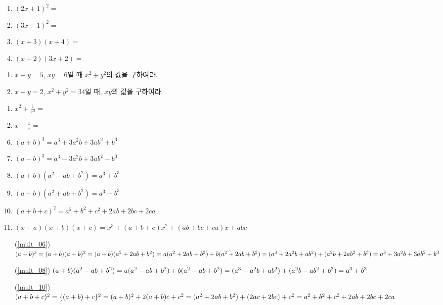 \documentclass{oblivoir}
\begin{document}
%
\begin{enumerate}\label{mult1}
\item
\((2x+1)^2=\)
\item
\((3x-1)^2=\)
\item
\((x+3)(x+4)=\)
\item
\((x+2)(3x+2)=\)
\end{enumerate}

%
\prob{}
\begin{enumerate}\label{mult2}
\item
\(x+y=5\), \(xy=6\)일 때 \(x^2+y^2\)의 값을 구하여라.
\item
\(x-y=2\), \(x^2+y^2=34\)일 때, \(xy\)의 값을 구하여라.
\end{enumerate}

%
\begin{enumerate}\label{mult3}
\item
\(x^2+\frac1{x^2}=\)
\item
\(x-\frac1x=\)
\end{enumerate}

\newpage
%
\begin{mdframed}
\begin{enumerate}
\setcounter{enumi}{5}
\item\label{mult_06}
\((a+b)^3=a^3+3a^2b+3ab^2+b^3\)
\item\label{mult_07}
\((a-b)^3=a^3-3a^2b+3ab^2-b^3\)
\item\label{mult_08}
\((a+b)(a^2-ab+b^2)=a^3+b^3\)
\item\label{mult_09}
\((a-b)(a^2+ab+b^2)=a^3-b^3\)
\item\label{mult_10}
\((a+b+c)^2=a^2+b^2+c^2+2ab+2bc+2ca\)
\item\label{mult_11}
\((x+a)(x+b)(x+c)=x^3+(a+b+c)x^2+(ab+bc+ca)x+abc\)
\end{enumerate}
\end{mdframed}

%
\begin{enumerate}
\item[(\ref{mult_06})]
\((a+b)^3=(a+b)(a+b)^2=(a+b)(a^2+2ab+b^2)\\
=a(a^2+2ab+b^2)+b(a^2+2ab+b^2) =(a^3+2a^2b+ab^2)+(a^2b+2ab^2+b^3)\\
=a^3+3a^2b+3ab^2+b^3\)
\item[(\ref{mult_08})]
\((a+b)(a^2-ab+b^2)=a(a^2-ab+b^2)+b(a^2-ab+b^2)\\
=(a^3-a^2b+ab^2)+(a^2b-ab^2+b^3)=a^3+b^3\)
\item[(\ref{mult_10})]
\((a+b+c)^2=\{(a+b)+c\}^2=(a+b)^2+2(a+b)c+c^2\\
=(a^2+2ab+b^2)+(2ac+2bc)+c^2=a^2+b^2+c^2+2ab+2bc+2ca\)
\end{enumerate}
\end{document}
